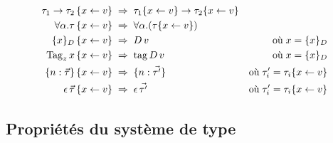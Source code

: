 \begin{align*}
  \tau_1 \rightarrow \tau_2
   \, \{x \leftarrow v\} \;&\Rightarrow\; 
    \tau_1 \{x \leftarrow v\} \rightarrow \tau_2 \{x \leftarrow v\}
  \\
  \forall \alpha. \tau
   \, \{x \leftarrow v\} \;&\Rightarrow\; 
  \forall \alpha. (\tau \{x \leftarrow v\})
  \\
  \{ x \}_D
   \, \{x \leftarrow v\} \;&\Rightarrow\; 
    D \, v
    &\text{où}\; x = \{ x \}_D
  \\
  \operatorname{Tag}_z x
   \, \{x \leftarrow v\} \;&\Rightarrow\; 
    \operatorname{tag} D \, v
    &\text{où}\; x = \{ x \}_D
  \\
  \{ n: \vec{\tau} \}
    \, \{x \leftarrow v\} \;&\Rightarrow\; 
    \{ n: \vec{\tau'} \}
    &\text{où}\; \tau'_i = \tau_i \{x \leftarrow v\}
  \\
  \epsilon \, \vec{\tau}
    \, \{x \leftarrow v\} \;&\Rightarrow\; \epsilon \, \vec{\tau'}
    &\text{où}\; \tau'_i = \tau_i \{x \leftarrow v\}
\end{align*}

\subsection{Propriétés du système de type}

